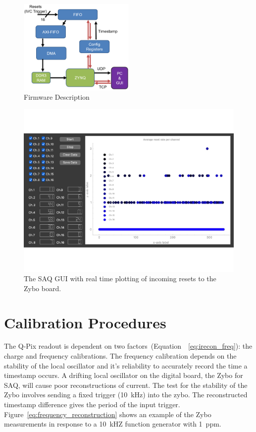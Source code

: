 \begin{figure}[]
\centering
\includegraphics[width=0.5\textwidth]{images/saq_daq_firmware_summary.png}
\caption{Firmware Description}
\label{fig:saq_firmware}
\end{figure}

\begin{figure}[]
\centering
\includegraphics[width=\textwidth]{images/SAQ_gui_resets.pdf}
\caption{The SAQ GUI with real time plotting of incoming resets to the Zybo board.}
\label{fig:saq_gui}
\end{figure}


\section{Calibration Procedures}

The Q-Pix readout is dependent on two factors~(Equation~~\ref{eq:irecon_freq}): the charge and frequency calibrations.
The frequency calibration depends on the stability of the local oscillator and it's reliability to accurately record the time a timestamp occurs.
A drifting local oscillator on the digital board, the Zybo for SAQ, will cause poor reconstructions of current.
The test for the stability of the Zybo involves sending a fixed trigger (10~\unit{kHz}) into the zybo.
The reconstructed timestamp difference gives the period of the input trigger.
Figure~\ref{eq:frequency_reconstruction} shows an example of the Zybo measurements in response to a 10~\unit{kHZ} function generator with 1~\unit{ppm}.

